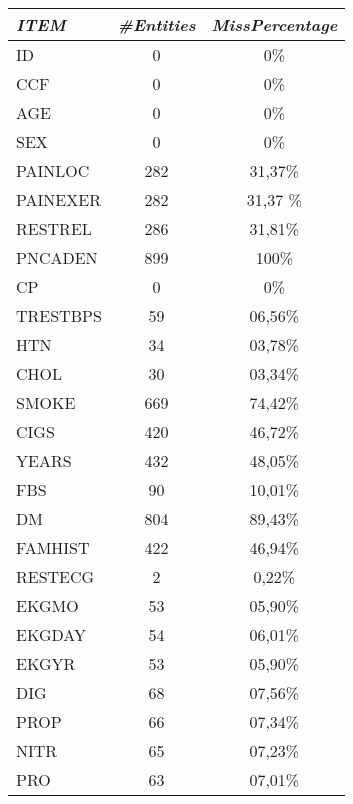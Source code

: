 \documentclass[a4paper,12pt]{article}
\begin{document}
    \begin{multicols}{2}
            \begin{tabular}{|l|c|c|} \hline

                \textit{ITEM}	& \textit{\#Entities}	& \textit{MissPercentage} \\
                \hline ID		&   0	&	0\% \\
                \hline CCF		&	0	&	0\% \\
                \hline AGE		&	0	&	0\% \\
                \hline SEX		&	0	&	0\% \\
                \hline PAINLOC	&	282	&	31,37\% \\
                \hline PAINEXER	&	282 & 	31,37 \% \\
                \hline RESTREL	&	286 &	31,81\% \\
                \hline PNCADEN	&	899 &	100\% \\
                \hline CP		&   0	&	0\% \\
                \hline TRESTBPS	&	59	&	06,56\% \\
                \hline HTN		& 	34	&	03,78\% \\
                \hline CHOL		& 	30	&	03,34\% \\
                \hline SMOKE	& 	669	&	74,42\% \\
                \hline CIGS		& 	420	&	46,72\% \\
                \hline YEARS	& 	432	&	48,05\% \\
                \hline FBS		& 	90	&	10,01\% \\
                \hline DM		& 	804	&	89,43\% \\
                \hline FAMHIST	&	422	& 	46,94\% \\
                \hline RESTECG	&	2	&	0,22\% \\
                \hline EKGMO	& 	53	&	05,90\% \\
                \hline EKGDAY	&	54	&	06,01\% \\
                \hline EKGYR	& 	53	&	05,90\% \\
                \hline DIG		& 	68	& 	07,56\% \\
                \hline PROP		& 	66	& 	07,34\% \\
                \hline NITR		& 	65	& 	07,23\% \\
                \hline PRO		&	63	& 	07,01\% \\ \hline
                

\end{tabular}
\end{multicols}
\end{document}

